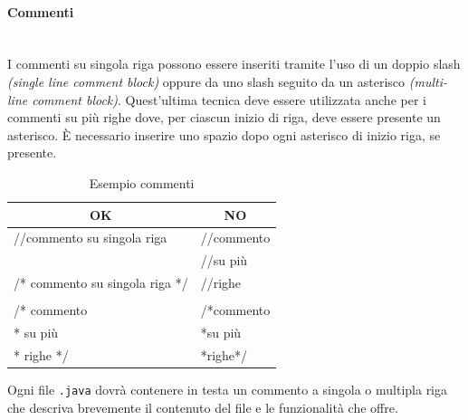 \paragraph{Commenti}\mbox{}\\[0.4cm]
I commenti su singola riga possono essere inseriti tramite l’uso di un doppio slash \emph{(single line comment block)} oppure da uno slash seguito da un asterisco \emph{(multi-line comment block)}. Quest’ultima tecnica deve essere utilizzata anche per i commenti su più righe dove, per ciascun inizio di riga, deve essere presente un asterisco. È necessario inserire uno spazio dopo ogni asterisco di inizio riga, se presente.
\begin{table} [H]
	\begin{center}
		\begin{tabular}{ | l | l |}
			\multicolumn{1}{c}{\textbf{OK}}&\multicolumn{1}{c}{\textbf{NO}}\\ 
			\hline
			//commento su singola riga & //commento\\
			& //su più\\
			/* commento su singola riga */& //righe\\
			&\\
			/* commento&/*commento\\
			\hspace{0.2cm}* su più&\hspace{0.2cm}*su più\\
			\hspace{0.2cm}* righe */&\hspace{0.2cm}*righe*/\\
			\hline
		\end{tabular}
	\end{center}
	\caption{Esempio commenti}
\end{table}
Ogni file \texttt{.java} dovrà contenere in testa un commento a singola o multipla riga che descriva brevemente il contenuto del file e le funzionalità che offre.
